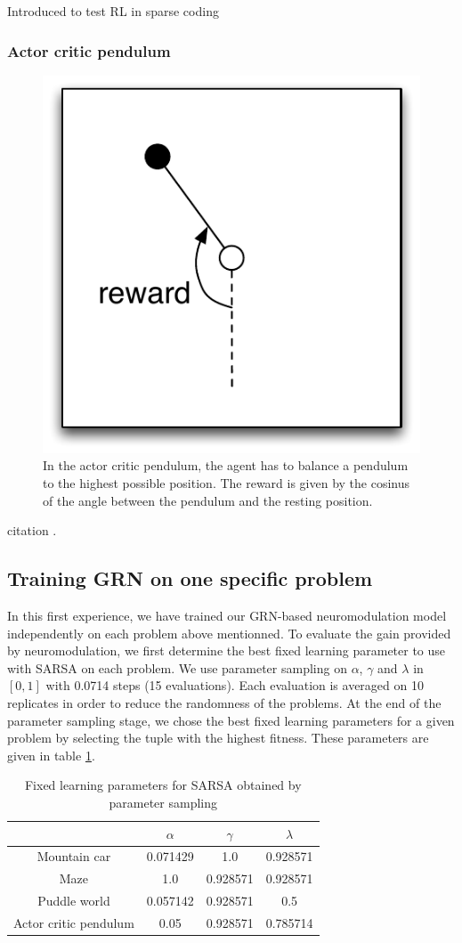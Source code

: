 Introduced to test RL in sparse coding \cite{sutton1996generalization}

\subsubsection{Actor critic pendulum}
\begin{figure}[h]
\center
\includegraphics[width=0.5\linewidth]{ACP_problem.pdf}
\caption{In the actor critic pendulum, the agent has to balance a pendulum to the highest possible position. The reward is given by the cosinus of the angle between the pendulum and the resting position.}\label{fig:MC:problem}
\end{figure}


citation \cite{sutton1998introduction}. 

\subsection{Training GRN on one specific problem}
In this first experience, we have trained our GRN-based neuromodulation model independently on each problem above mentionned. To evaluate the gain provided by neuromodulation, we first determine the best fixed learning parameter to use with SARSA on each problem. We use parameter sampling on $\alpha$, $\gamma$ and $\lambda$ in $[0, 1]$ with 0.0714 steps (15 evaluations). Each evaluation is averaged on 10 replicates in order to reduce the randomness of the problems. At the end of the parameter sampling stage, we chose the best fixed learning parameters for a given problem by selecting the tuple with the highest fitness. These parameters are given in table \ref{tab:SARSAFixedParams}.

\begin{table}[h]
\begin{tabular}{|c|ccc|}
\cline{2-4}
\multicolumn{1}{c|}{ }	& $\alpha$	& $\gamma$	& $\lambda$	\\\hline
Mountain car			& 0.071429	& 1.0		& 0.928571 	\\%
Maze				& 1.0		& 0.928571	& 0.928571	\\%
Puddle world			&  0.057142	& 0.928571	& 0.5		\\%
Actor critic pendulum	& 0.05		& 0.928571	& 0.785714	\\\hline
\end{tabular}
\caption{Fixed learning parameters for SARSA obtained by parameter sampling}\label{tab:SARSAFixedParams}
\end{table}

